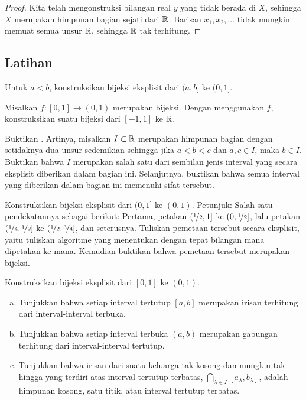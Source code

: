 \begin{proof}
Kita telah mengonstruksi bilangan real $y$ yang tidak berada di $X$, sehingga $X$
merupakan himpunan bagian sejati dari ${\mathbb{R}}$.
Barisan $x_1,x_2,\ldots$ tidak mungkin memuat semua unsur ${\mathbb{R}}$,
sehingga ${\mathbb{R}}$ tak terhitung.
\end{proof}

\subsection{Latihan}

\begin{exercise}
Untuk $a < b$, konstruksikan bijeksi eksplisit dari $(a,b]$ ke $(0,1]$.
\end{exercise}

\begin{exercise}
Misalkan $f \colon [0,1] \to (0,1)$ merupakan bijeksi.
Dengan menggunakan $f$, konstruksikan suatu
bijeksi dari $[-1,1]$ ke ${\mathbb{R}}$.
\end{exercise}

\begin{exercise} \label{exercise:intervaldef}
Buktikan .
Artinya,
misalkan $I \subset {\mathbb{R}}$ merupakan himpunan bagian dengan setidaknya dua unsur
sedemikian sehingga jika $a < b < c$ dan $a, c \in I$, maka $b \in I$.
Buktikan bahwa $I$ merupakan salah satu dari sembilan jenis interval yang secara eksplisit
diberikan dalam bagian ini.
Selanjutnya, buktikan bahwa semua interval yang diberikan dalam bagian ini
memenuhi sifat tersebut.
\end{exercise}

\begin{exercise}[Sulit]
Konstruksikan bijeksi eksplisit dari $(0,1]$ ke $(0,1)$.
Petunjuk: Salah satu pendekatannya sebagai berikut: Pertama, petakan $(\nicefrac{1}{2},1]$
ke $(0,\nicefrac{1}{2}]$, lalu petakan
$(\nicefrac{1}{4},\nicefrac{1}{2}]$
ke $(\nicefrac{1}{2},\nicefrac{3}{4}]$, dan seterusnya.
Tuliskan pemetaan tersebut secara eksplisit, yaitu
tuliskan algoritme yang menentukan dengan tepat bilangan mana dipetakan ke mana.
Kemudian buktikan bahwa pemetaan tersebut merupakan bijeksi.
\end{exercise}

\begin{exercise}[Sulit]
Konstruksikan bijeksi eksplisit dari $[0,1]$ ke $(0,1)$.
\end{exercise}

\begin{exercise}
\leavevmode
\begin{enumerate}[a)]
\item
Tunjukkan bahwa setiap interval tertutup $[a,b]$ merupakan irisan terhitung
dari interval-interval terbuka.
\item
Tunjukkan bahwa setiap interval terbuka $(a,b)$
merupakan gabungan terhitung dari interval-interval tertutup.
\item
Tunjukkan bahwa irisan
dari suatu keluarga tak kosong dan mungkin tak hingga yang terdiri atas interval tertutup terbatas,
$\bigcap\limits_{\lambda \in I} [a_\lambda,b_\lambda]$,
adalah himpunan kosong, satu titik,
atau interval tertutup terbatas.
\end{enumerate}
\end{exercise}

